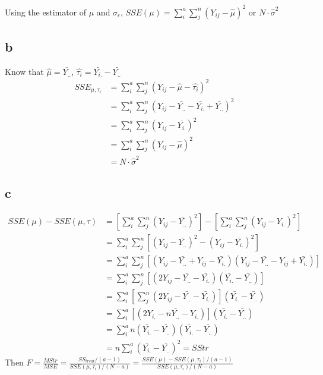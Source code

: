 \documentclass[11pt,letterpaper]{article}
\begin{document}
\noindent Using the estimator of $\mu$ and $\sigma_{\epsilon}$, $SSE(\mu) = \sum_i^a \sum_j^n (Y_{ij} - \hat{\mu})^2$ or $N \cdot \hat{\sigma}^2$

\subsection*{b}
\noindent Know that $\hat{\mu} = \bar{Y_{..}}$, $\hat{\tau_i} = \bar{Y_{i.}} - \bar{Y_{..}}$
\begin{align*}
SSE_{\mu, \tau_i} &= \sum_i^a \sum_j^n (Y_{ij} - \hat{\mu} - \hat{\tau_i})^2 \\
&= \sum_i^a \sum_j^n (Y_{ij} - \bar{Y_{..}} - \bar{Y_{i.}} + \bar{Y_{..}})^2 \\
&= \sum_i^a \sum_j^n (Y_{ij} - \bar{Y_{i.}})^2 \\
&= \sum_i^a \sum_j^n (Y_{ij} - \hat{\mu})^2 \\
&= N \cdot \hat{\sigma}^2
\end{align*}

\subsection*{c}
\begin{align*}
SSE(\mu) - SSE(\mu, \tau) &= [\sum_i^a \sum_j^n (Y_{ij} - \bar{Y_{..}})^2 ]- [\sum_i^a \sum_j^n (Y_{ij} - Y_{i.})^2] \\
&= \sum_i^a \sum_j^n [(Y_{ij} - \bar{Y_{..}})^2 - (Y_{ij} - \bar{Y_{i.}})^2] \\
&= \sum_i^a \sum_j^n [(Y_{ij} - \bar{Y_{..}}  + Y_{ij} - \bar{Y_{i.}} ) (Y_{ij} - \bar{Y_{..}} - Y_{ij} + \bar{Y_{i.}})] \\
&= \sum_i^a \sum_j^n [(2 Y_{ij} - \bar{Y_{..}}  - \bar{Y_{i.}} ) (\bar{Y_{i.}} - \bar{Y_{..}})] \\
&= \sum_i^a [\sum_j^n (2 Y_{ij} - \bar{Y_{..}}  - \bar{Y_{i.}} ) ] (\bar{Y_{i.}} - \bar{Y_{..}}) \\
&= \sum_i^a [(2 Y_{i.} - n\bar{Y_{..}}  - Y_{i.}) ] (\bar{Y_{i.}} - \bar{Y_{..}})\\
&= \sum_i^a n(\bar{Y_{i.}} - \bar{Y_{..}}) (\bar{Y_{i.}} - \bar{Y_{..}})\\
&= n \sum_i^a (\bar{Y_{i.}} - \bar{Y_{..}})^2 = SStr
\end{align*}
\noindent Then $F = \frac{MStr}{MSE} = \frac{SS_{treat}/ (a-1)}{SSE(\mu, \tau_i) / (N-a)} = \frac{SSE(\mu) - SSE(\mu, \tau_i) / (a-1)}{SSE(\mu, \tau_i) / (N-a)}$ 
\end{document}
